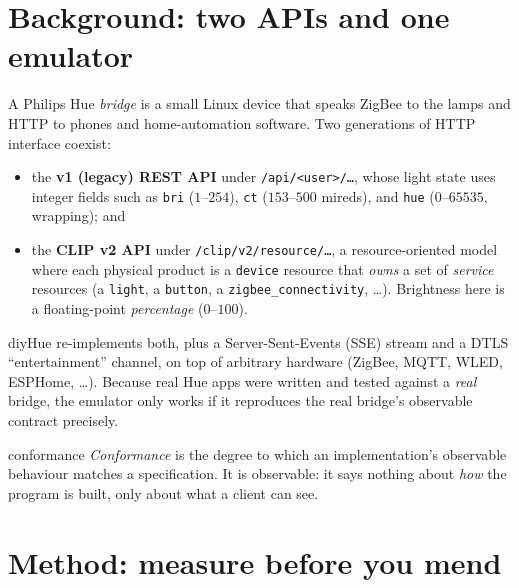 \documentclass[11pt,a4paper]{article}
\newcommand{\code}[1]{\texttt{#1}}
\begin{document}
\tableofcontents
\bigskip

\section{Background: two APIs and one emulator}

A Philips Hue \emph{bridge} is a small Linux device that speaks ZigBee to the
lamps and HTTP to phones and home-automation software. Two generations of HTTP
interface coexist:

\begin{itemize}
  \item the \textbf{v1 (legacy) REST API} under \code{/api/<user>/\ldots},
        whose light state uses integer fields such as \code{bri}
        ($1$--$254$), \code{ct} ($153$--$500$ mireds), and \code{hue}
        ($0$--$65535$, wrapping); and
  \item the \textbf{CLIP v2 API} under \code{/clip/v2/resource/\ldots}, a
        resource-oriented model where each physical product is a
        \code{device} resource that \emph{owns} a set of \emph{service}
        resources (a \code{light}, a \code{button}, a \code{zigbee\_con\-nec\-tiv\-ity},
        \ldots). Brightness here is a floating-point \emph{percentage}
        ($0$--$100$).
\end{itemize}

\textsf{diyHue} re-implements both, plus a Server-Sent-Events (SSE) stream and a
DTLS ``entertainment'' channel, on top of arbitrary hardware (ZigBee, MQTT,
WLED, ESPHome, \ldots). Because real Hue apps were written and tested against a
\emph{real} bridge, the emulator only works if it reproduces the real bridge's
observable contract precisely.

\begin{defbox}{conformance}
\emph{Conformance} is the degree to which an implementation's observable
behaviour matches a specification. It is observable: it says nothing about
\emph{how} the program is built, only about what a client can see.
\end{defbox}

\section{Method: measure before you mend}
\end{document}
